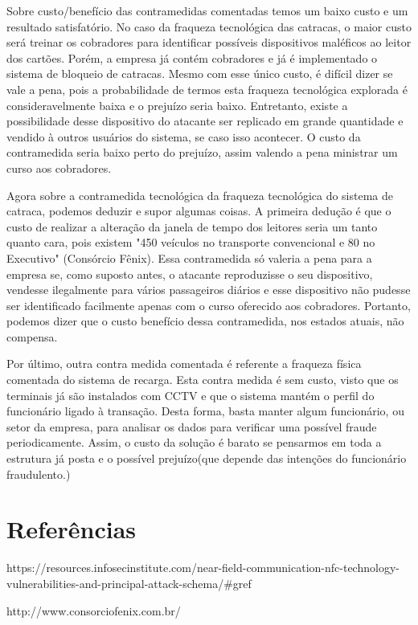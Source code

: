 \documentclass[openany]{ufsctex/ufsctex}
\begin{document}
Sobre custo/benefício das contramedidas comentadas temos um baixo custo e um resultado satisfatório. No caso da fraqueza tecnológica das catracas, o maior custo será treinar os cobradores para identificar possíveis dispositivos maléficos ao leitor dos cartões. Porém, a empresa já contém cobradores e já é implementado o sistema de bloqueio de catracas. Mesmo com esse único custo, é difícil dizer se vale a pena, pois a probabilidade de termos esta fraqueza tecnológica explorada é consideravelmente baixa e o prejuízo seria baixo. Entretanto, existe a possibilidade desse dispositivo do atacante ser replicado em grande quantidade e vendido à outros usuários do sistema, se caso isso acontecer. O custo da contramedida seria baixo perto do prejuízo, assim valendo a pena ministrar um curso aos cobradores.


	Agora sobre a contramedida tecnológica da fraqueza tecnológica do sistema de catraca, podemos deduzir e supor algumas coisas. A primeira dedução é que o custo de realizar a alteração da janela de tempo dos leitores seria um tanto quanto cara, pois existem "450 veículos no transporte convencional e 80 no Executivo" (Consórcio Fênix). Essa contramedida só valeria a pena para a empresa se, como suposto antes, o atacante reproduzisse o seu dispositivo, vendesse ilegalmente para vários passageiros diários e esse dispositivo não pudesse ser identificado facilmente apenas com o curso oferecido aos cobradores. Portanto, podemos dizer que o custo benefício dessa contramedida, nos estados atuais, não compensa. 


	Por último, outra contra medida comentada é referente a fraqueza física comentada do sistema de recarga. Esta contra medida é sem custo, visto que os terminais  já são instalados com CCTV e que o sistema mantém o perfil do funcionário ligado à transação. Desta forma, basta manter algum funcionário, ou setor da empresa, para analisar os dados para verificar uma possível fraude periodicamente. Assim, o custo da solução é barato se pensarmos em toda a estrutura já posta e o possível prejuízo(que depende das intenções do funcionário fraudulento.)
	

    \chapter{Referências}
    
    https://resources.infosecinstitute.com/near-field-communication-nfc-technology-vulnerabilities-and-principal-attack-schema/\#gref
    
    
    
    
        http://www.consorciofenix.com.br/
    
    
\end{document}
